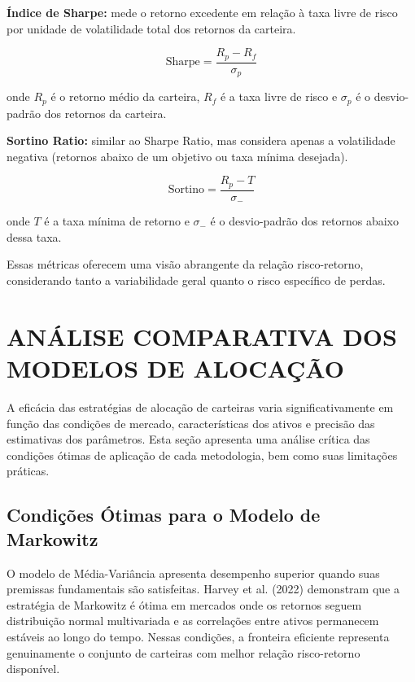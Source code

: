 \textbf{Índice de Sharpe:} mede o retorno excedente em relação à taxa livre de risco por unidade de volatilidade total dos retornos da carteira.

\begin{equation}
\label{eq:sharpe_ratio}
\text{Sharpe} = \frac{R_p - R_f}{\sigma_p}
\end{equation}

onde $R_p$ é o retorno médio da carteira, $R_f$ é a taxa livre de risco e $\sigma_p$ é o desvio-padrão dos retornos da carteira.

\textbf{Sortino Ratio:} similar ao Sharpe Ratio, mas considera apenas a volatilidade negativa (retornos abaixo de um objetivo ou taxa mínima desejada).

\begin{equation}
\label{eq:sortino_ratio}
\text{Sortino} = \frac{R_p - T}{\sigma_-}
\end{equation}

onde $T$ é a taxa mínima de retorno e $\sigma_-$ é o desvio-padrão dos retornos abaixo dessa taxa.

Essas métricas oferecem uma visão abrangente da relação risco-retorno, considerando tanto a variabilidade geral quanto o risco específico de perdas.

\section{ANÁLISE COMPARATIVA DOS MODELOS DE ALOCAÇÃO}

A eficácia das estratégias de alocação de carteiras varia significativamente em função das condições de mercado, características dos ativos e precisão das estimativas dos parâmetros. Esta seção apresenta uma análise crítica das condições ótimas de aplicação de cada metodologia, bem como suas limitações práticas.

\subsection{Condições Ótimas para o Modelo de Markowitz}

O modelo de Média-Variância apresenta desempenho superior quando suas premissas fundamentais são satisfeitas. Harvey et al. (2022) demonstram que a estratégia de Markowitz é ótima em mercados onde os retornos seguem distribuição normal multivariada e as correlações entre ativos permanecem estáveis ao longo do tempo. Nessas condições, a fronteira eficiente representa genuinamente o conjunto de carteiras com melhor relação risco-retorno disponível.

